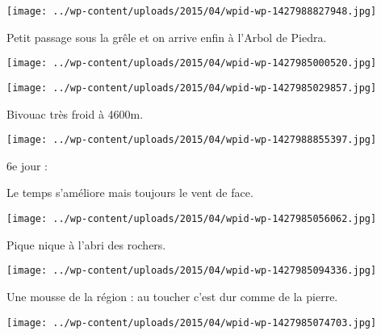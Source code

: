  

\begin{center} \texttt{[image: ../wp-content/uploads/2015/04/wpid-wp-1427988827948.jpg]} \end{center}



 Petit passage sous la grêle et on arrive enfin à l'Arbol de Piedra.

 

\begin{center} \texttt{[image: ../wp-content/uploads/2015/04/wpid-wp-1427985000520.jpg]} \end{center}



 

\begin{center} \texttt{[image: ../wp-content/uploads/2015/04/wpid-wp-1427985029857.jpg]} \end{center}



 Bivouac très froid à 4600m.

 

\begin{center} \texttt{[image: ../wp-content/uploads/2015/04/wpid-wp-1427988855397.jpg]} \end{center}



 6e jour : 

 Le temps s'améliore mais toujours le vent de face.

 

\begin{center} \texttt{[image: ../wp-content/uploads/2015/04/wpid-wp-1427985056062.jpg]} \end{center}



 Pique nique à l'abri des rochers.

 

\begin{center} \texttt{[image: ../wp-content/uploads/2015/04/wpid-wp-1427985094336.jpg]} \end{center}



 Une mousse de la région : au toucher c'est dur comme de la pierre.

 

\begin{center} \texttt{[image: ../wp-content/uploads/2015/04/wpid-wp-1427985074703.jpg]} \end{center}



